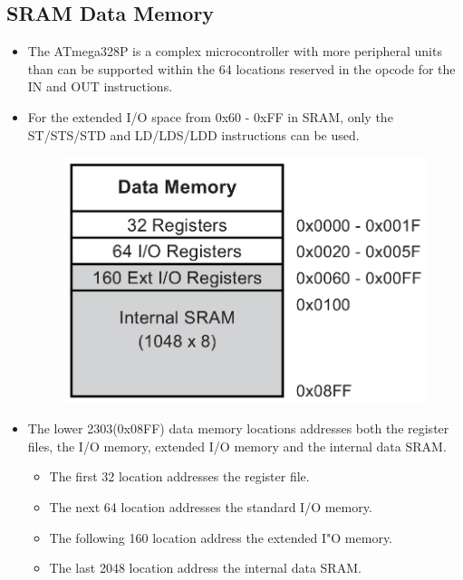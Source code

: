 \documentclass{article}
\begin{document}
\subsection{SRAM Data Memory}
\begin{itemize}
    \item The ATmega328P is a complex microcontroller with more peripheral units than can be supported within the 64 locations reserved in the opcode for the IN and OUT instructions.
    \item For the extended I/O space from 0x60 - 0xFF in SRAM, only the ST/STS/STD and LD/LDS/LDD instructions can be used.
    \begin{figure}[H]
        \begin{center}
            \includegraphics[height=0.25\textheight]{dataMemorySRAM.png}
        \end{center}
    \end{figure}
    \item The lower 2303(0x08FF) data memory locations addresses both the register files, the I/O memory, extended I/O memory and the internal data SRAM.
    \begin{itemize}
        \item The first 32 location addresses the register file.
        \item The next 64 location addresses the standard I/O memory.
        \item The following 160 location address the extended I"O memory.
        \item The last 2048 location address the internal data SRAM.
    \end{itemize}
\end{itemize}
\end{document}
